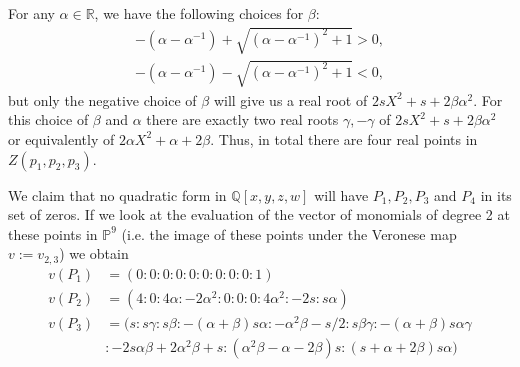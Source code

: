 \documentclass[a4paper,11pt]{amsart}%
\newcommand{\comment}[1]{}
\newcommand\Q{\mathbb{Q}}
\newcommand\R{\mathbb{R}}
\renewcommand\P{\mathbb{P}}
\theoremstyle{definition}
\begin{document}
\noindent For any $\alpha \in \R$, we have the following choices for $\beta$:
\begin{align*}
-(\alpha-\alpha^{-1})+\sqrt{(\alpha-\alpha^{-1})^2+1}>0,\\
-(\alpha-\alpha^{-1})-\sqrt{(\alpha-\alpha^{-1})^2+1}<0,
\end{align*}
but only the negative choice of $\beta$ will give us a real root of $2sX^2+s+2\beta\alpha^2$.
For this choice of $\beta$ and $\alpha$ there are exactly two real roots  $\gamma, -\gamma$ of
$2sX^2+s+2\beta\alpha^2$ or equivalently of $2\alpha X^2+\alpha+2\beta$. Thus, in total there are four real points
in $Z(p_1,p_2,p_3)$.

\comment{
We can write the four points as
\begin{multicols}{2}\noindent
\begin{align*}
P_1&=(0:0:1:0),\\
P_2&=(0:2\alpha:-\alpha^2:2),
\end{align*}
\begin{align*}
P_3&=(\gamma:\beta:-\alpha^2-\alpha\beta:1),\\
P_4&=(-\gamma:\beta:-\alpha^2-\alpha\beta:1).
\end{align*}\end{multicols}
}

We claim that no quadratic form in $\Q[x,y,z,w]$ will have $P_1,P_2,P_3$ and $P_4$ in its set of zeros. If we
look at the evaluation of the vector of monomials of degree 2 at these points in $\P^9$ (i.e. the image of these points
under the Veronese map $v:=v_{2,3}$) we obtain
\begin{align*}
v(P_1)&=(0:0:0:0:0:0:0:0:0:1)\\
v(P_2)&=(4:0:4 \alpha:-2 \alpha^2:0:0:0:4 \alpha^2:-2 s:s\alpha)\\
v(P_3)&=(s:s\gamma:s\beta:-(\alpha+\beta)s\alpha:-\alpha^2\beta-s/2:s\beta \gamma:-(\alpha+\beta)s\alpha\gamma\\
  &:-2s\alpha\beta+2\alpha^2\beta+s:(\alpha^2\beta-\alpha-2\beta)s:(s+\alpha+2\beta)s\alpha)
\end{align*}
\end{document}
